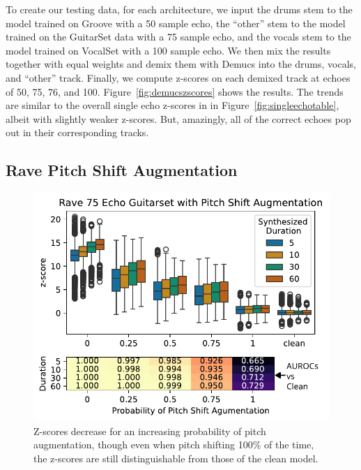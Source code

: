 \documentclass[letterpaper]{article} %
\begin{document}
To create our testing data, for each architecture, we input the drums stem to the model trained on Groove with a 50 sample echo, the ``other'' stem to the model trained on the GuitarSet data with a 75 sample echo, and the vocals stem to the model trained on VocalSet with a 100 sample echo.  We then mix the results together with equal weights and demix them with Demucs into the drums, vocals, and ``other'' track.  Finally, we compute z-scores on each demixed track at echoes of 50, 75, 76, and 100.  Figure~\ref{fig:demucszscores} shows the results.  The trends are similar to the overall single echo z-scores in in Figure~\ref{fig:singleechotable}, albeit with slightly weaker z-scores.  But, amazingly, all of the correct echoes pop out in their corresponding tracks.


\subsection{Rave Pitch Shift Augmentation}

\begin{figure}
    \centering
    \includegraphics[width=\columnwidth]{figs/RavePercPitchShift.pdf}
    \caption{Z-scores decrease for an increasing probability of pitch augmentation, though even when pitch shifting 100\% of the time, the z-scores are still distinguishable from those of the clean model.}
    \label{fig:pitchshiftaugmentation}
\end{figure}
\end{document}
